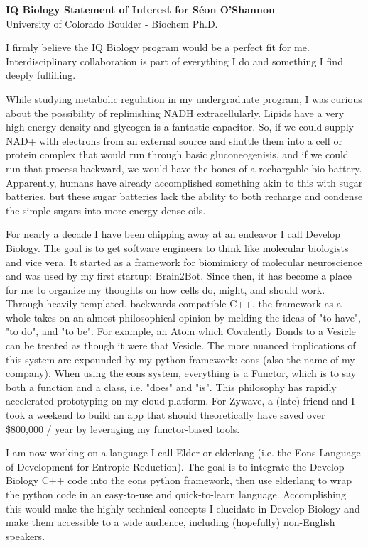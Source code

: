 \documentclass[12pt]{article}
\begin{document}
\begin{center}
    \Large{\textbf{IQ Biology Statement of Interest for Séon O'Shannon}} \\
    University of Colorado Boulder - Biochem Ph.D.
\end{center}

\vspace{0.5cm}

I firmly believe the IQ Biology program would be a perfect fit for me. Interdisciplinary collaboration is part of everything I do and something I find deeply fulfilling.

While studying metabolic regulation in my undergraduate program, I was curious about the possibility of replinishing NADH extracellularly. Lipids have a very high energy density and glycogen is a fantastic capacitor. So, if we could supply NAD+ with electrons from an external source and shuttle them into a cell or protein complex that would run through basic gluconeogenisis, and if we could run that process backward, we would have the bones of a rechargable bio battery. Apparently, humans have already accomplished something akin to this with sugar batteries, but these sugar batteries lack the ability to both recharge and condense the simple sugars into more energy dense oils.

For nearly a decade I have been chipping away at an endeavor I call Develop Biology. The goal is to get software engineers to think like molecular biologists and vice vera. It started as a framework for biomimicry of molecular neuroscience and was used by my first startup: Brain2Bot. Since then, it has become a place for me to organize my thoughts on how cells do, might, and should work. Through heavily templated, backwards-compatible C++, the framework as a whole takes on an almost philosophical opinion by melding the ideas of "to have", "to do", and "to be". For example, an Atom which Covalently Bonds to a Vesicle can be treated as though it were that Vesicle. The more nuanced implications of this system are expounded by my python framework: eons (also the name of my company). When using the eons system, everything is a Functor, which is to say both a function and a class, i.e. "does" and "is". This philosophy has rapidly accelerated prototyping on my cloud platform. For Zywave, a (late) friend and I took a weekend to build an app that should theoretically have saved over \$800,000 / year by leveraging my functor-based tools.

I am now working on a language I call Elder or elderlang (i.e. the Eons Language of Development for Entropic Reduction). The goal is to integrate the Develop Biology C++ code into the eons python framework, then use elderlang to wrap the python code in an easy-to-use and quick-to-learn language. Accomplishing this would make the highly technical concepts I elucidate in Develop Biology and make them accessible to a wide audience, including (hopefully) non-English speakers.
\end{document}
